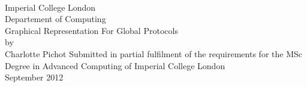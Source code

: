 \begin{titlepage}
\begin{center}
~~\\[1.5cm]
Imperial College London\\[0.5cm]
Departement of Computing\\[4cm]
{\Huge Graphical Representation For Global Protocols}\\[0.5cm]
{\large by}\\[0.5cm]
{\Large Charlotte Pichot}
\vfill
Submitted in partial fulfilment of the requirements for the MSc Degree in Advanced Computing of Imperial College London\\[3cm] 
September 2012\\[1.5cm]
\end{center}
\end{titlepage}